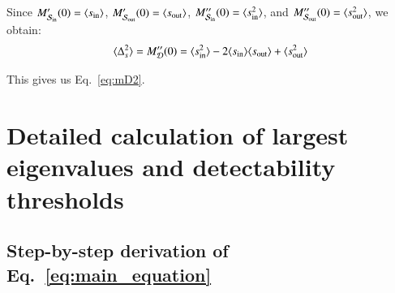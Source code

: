\documentclass[a4paper,pre,superscriptaddress,floatfix,nofootinbib,twocolumn]{revtex4-1}
\begin{document}
Since $M'_{{\cal S}_\text{in}}(0) = \langle s_\text{in} \rangle$, $M'_{{\cal S}_\text{out}}(0) = \langle s_\text{out} \rangle$, $M''_{{\cal S}_\text{in}}(0) = \langle s^2_\text{in} \rangle$, and $M''_{{\cal S}_\text{out}}(0) = \langle s^2_\text{out} \rangle$, we obtain:
\[
\langle \Delta_s^2 \rangle = M''_{\cal D}(0) = \langle s^2_\text{in} \rangle - 2 \langle s_\text{in} \rangle \langle s_\text{out} \rangle + \langle s^2_\text{out} \rangle
\]

This gives us Eq.~\eqref{eq:mD2}.




\section{Detailed calculation of largest eigenvalues and detectability thresholds}
\label{sec:threshold_calculations}

\subsection*{Step-by-step derivation of Eq.~\eqref{eq:main_equation}}
\label{sec:derivation_of_main_equation}
\end{document}
